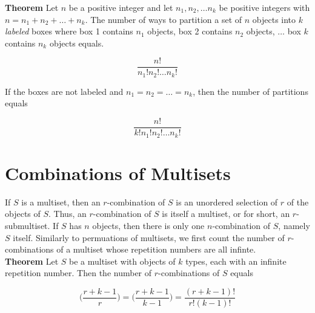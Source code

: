 \documentclass[12pt, letterpaper]{article}
\begin{document}
\noindent 
\textbf{Theorem} Let \(n\) be a positive integer and let \(n_1, n_2, \dots n_k\) be positive integers with
\(n = n_1 + n_2 + \dots + n_k \). The number of ways to partition a set of \(n\) objects into \(k\) \textit{labeled} boxes 
where box 1 contains \(n_1\) objects, box 2 contains \(n_2\) objects, \(\dots\) box \(k\) contains \(n_k\) objects equals. 

\[
  \frac{n!}{n_1! n_2! \dots n_k!}
\]

If the boxes are not labeled and \(n_1 = n_2 = \dots = n_k \), then the number of partitions equals

\[
  \frac{n!}{k! n_1! n_2! \dots n_k!}
\]

\section*{Combinations of Multisets}

If \(S\) is a multiset, then an \(r\)-combination of \(S\) is an unordered selection of \(r\) of the objects of \(S\).
Thus, an \(r\)-combination of \(S\) is itself a multiset, or for short, an \(r\)-submultiset. If \(S\)
has \(n\) objects, then there is only one \(n\)-combination of \(S\), namely \(S\) itself. Similarly to permuations of multisets, 
we first count the number of \(r\)-combinations of a multiset whose repetition numbers are all infinte. \\

\noindent
\textbf{Theorem} Let \(S\) be a multiset with objects of \(k\) types, each with an infinite repetition number.
Then the number of \(r\)-combinations of \(S\) equals 

\[
  \Big( \frac{r + k - 1}{r} \Big) = \Big( \frac{r + k - 1}{k - 1} \Big) = \frac{(r + k - 1)!}{r! (k - 1)!}
\]
\end{document}
